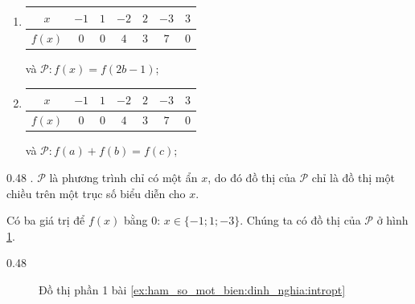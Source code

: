 \begin{enumerate}
   \item
   \begin{tabular}{|c|c|c|c|c|c|c|}
      \hline
      $x$ & $-1$ & $1$ & $-2$ & $2$ & $-3$ & $3$\\
      \hline
      $f(x)$ & $0$ & $0$ & $4$ & $3$ & $7$ & $0$\\
      \hline
   \end{tabular} và $\mathcal{P}: f(x) = f(2b - 1)$;

   \item 
   \begin{tabular}{|c|c|c|c|c|c|c|}
      \hline
      $x$ & $-1$ & $1$ & $-2$ & $2$ & $-3$ & $3$\\
      \hline
      $f(x)$ & $0$ & $0$ & $4$ & $3$ & $7$ & $0$\\
      \hline
   \end{tabular} và $\mathcal{P}: f(a) + f(b) = f(c)$;
\end{enumerate}


{
   \begin{minipageindent}{0.48\textwidth}
      \setcounter{subexercise}{1}
      . $\mathcal{P}$ là phương trình chỉ có một ẩn $x$, do đó đồ thị của $\mathcal{P}$ chỉ là đồ thị một chiều trên một trục số biểu diễn cho $x$.

      Có ba giá trị để $f(x)$ bằng $0$: $x\in \{-1; 1; -3\}$. Chúng ta có đồ thị của $\mathcal{P}$ ở hình \ref{fig:ham_so_mot_bien:dinh_nghia:dtp1}.
   \end{minipageindent}
   \hfill
   \begin{minipageindent}{0.48\textwidth}
      \begin{figure}[H]
         \centering
         \caption{Đồ thị phần 1 bài \ref{ex:ham_so_mot_bien:dinh_nghia:intropt}}
         \label{fig:ham_so_mot_bien:dinh_nghia:dtp1}
      \end{figure}
   \end{minipageindent}
}


